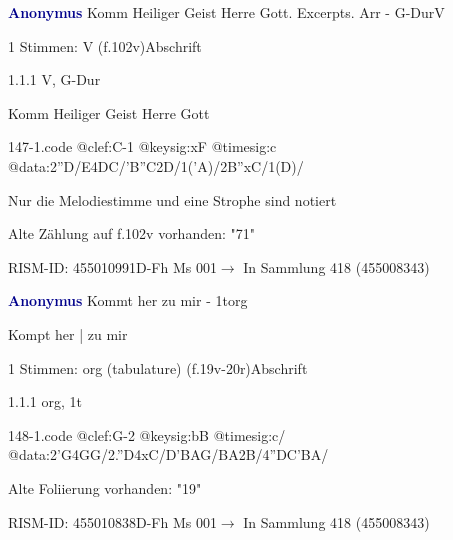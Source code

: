\documentclass[twocolumn]{book}
\begin{document}
\par \vspace{7pt} \textcolor{darkblue}{\textbf{Anonymus  }}\hfillplus{\textbf{[147]}}\newline Komm Heiliger Geist Herre Gott. Excerpts. Arr - G-Dur\newline V
\par \begin{itshape}\end{itshape} 
\par \textcolor{darkblue}{}  1 Stimmen: V  (f.102v)\newline Abschrift
\par 1.1.1  V, G-Dur\newline \begin{footnotesize} Komm Heiliger Geist Herre Gott \end{footnotesize}  
\begin{filecontents*}{147-1.code}
@clef:C-1
@keysig:xF
@timesig:c
@data:2''D/E4DC/'B''C2D/1('A)/2B''xC/1(D)/
\end{filecontents*}
\newline
%
\par Nur die Melodiestimme und eine Strophe sind notiert
\par Alte Zählung auf f.102v vorhanden: "71"
\par RISM-ID: 455010991\newline D-Fh  Ms 001\newline $\rightarrow$ In Sammlung 418 (455008343)
      
\par \vspace{7pt} \textcolor{darkblue}{\textbf{Anonymus  }}\hfillplus{\textbf{[148]}}\newline Kommt her zu mir - 1t\newline org
\par \begin{itshape}[f.19v, at left:] Kompt her | zu mir\end{itshape} 
\par \textcolor{darkblue}{}  1 Stimmen: org (tabulature)  (f.19v-20r)\newline Abschrift
\par 1.1.1  org, 1t  
\begin{filecontents*}{148-1.code}
@clef:G-2
@keysig:bB
@timesig:c/
@data:2'G4GG/2.''D4xC/D'BAG/BA2B/4''DC'BA/
\end{filecontents*}
\newline
%
\par Alte Foliierung vorhanden: "19"
\par RISM-ID: 455010838\newline D-Fh  Ms 001\newline $\rightarrow$ In Sammlung 418 (455008343)
      
\end{document}
